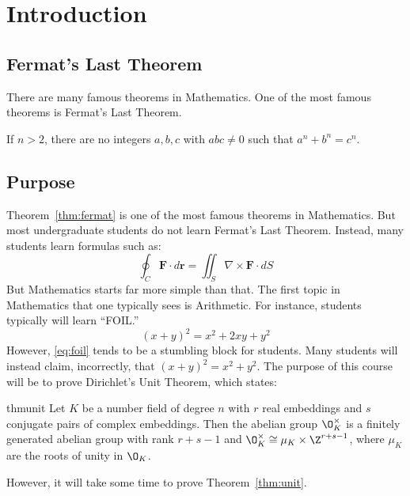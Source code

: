 \newpage
\section{Introduction \label{sec:intro}}
\subsection{Fermat's Last Theorem \label{sec:fermat}}

There are many famous theorems in Mathematics. One of the most famous theorems is Fermat's Last Theorem.

\begin{thm} \label{thm:fermat}
If $n>2$, there are no integers $a,b,c$ with $abc \neq 0$ such that $a^n + b^n= c^n$.
\end{thm}


\subsection{Purpose}

Theorem~\ref{thm:fermat} is one of the most famous theorems in Mathematics. But most undergraduate students do not learn Fermat's Last Theorem. Instead, many students learn formulas such as:
	\[
	\oint_C \mathbf{F} \cdot d\mathbf{r} = \iint_S \nabla \times \mathbf{F} \cdot dS
	\]
But Mathematics starts far more simple than that. The first topic in Mathematics that one typically sees is Arithmetic. For instance, students typically will learn ``FOIL.'' 
	\begin{equation} \label{eq:foil}
	(x + y)^2= x^2 + 2xy + y^2
	\end{equation}
However, \eqref{eq:foil} tends to be a stumbling block for students. Many students will instead claim, incorrectly, that $(x+y)^2= x^2 + y^2$. The purpose of this course will be to prove Dirichlet's Unit Theorem, which states:

\begin{restatable*}{thm}{unit} \label{thm:unit}
Let $K$ be a number field of degree $n$ with $r$ real embeddings and $s$ conjugate pairs of complex embeddings. Then the abelian group $\O_K^\times$ is a finitely generated abelian group with rank $r+s-1$ and $\O_K^\times \cong \mu_K \times \Z^{r+s-1}$, where $\mu_K$ are the roots of unity in $\O_K$. 
\end{restatable*}


However, it will take some time to prove Theorem~\ref{thm:unit}.
